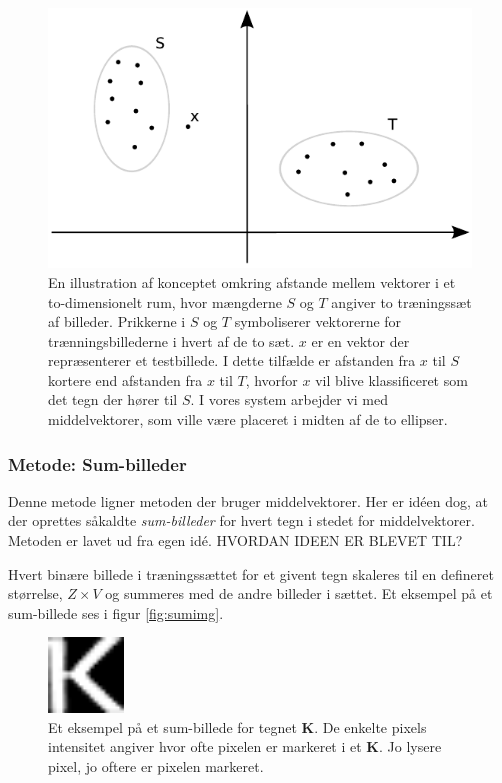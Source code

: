 \begin{figure}[htp]
\centering
\includegraphics{system/illu/middelvektor_afstand.pdf} 
\caption{En illustration af konceptet omkring afstande mellem vektorer i et to-dimensionelt rum, hvor mængderne $S$ og $T$ angiver to træningssæt af billeder. Prikkerne i $S$ og $T$ symboliserer vektorerne for trænningsbillederne i hvert af de to sæt. $x$ er en vektor der repræsenterer et testbillede. I dette tilfælde er afstanden fra $x$ til $S$ kortere end afstanden fra $x$ til $T$, hvorfor $x$ vil blive klassificeret som det tegn der hører til $S$. I vores system arbejder vi med middelvektorer, som ville være placeret i midten af de to ellipser.}
\label{fig:middelvektor_afstand}
\end{figure}

\subsubsection*{Metode: Sum-billeder}

Denne metode ligner metoden der bruger middelvektorer. Her er idéen dog, at der oprettes såkaldte \textit{sum-billeder} for hvert tegn i stedet for middelvektorer. Metoden er lavet ud fra egen idé. HVORDAN IDEEN ER BLEVET TIL?

Hvert binære billede i træningssættet for et givent tegn skaleres til en defineret størrelse, $Z \times V$ og summeres med de andre billeder i sættet. Et eksempel på et sum-billede ses i figur \vref{fig:sumimg}.

\begin{figure}[htp]
\centering
\includegraphics[width=2cm]{system/illu/sumimg.png} 
\caption{Et eksempel på et sum-billede for tegnet \textbf{K}. De enkelte pixels intensitet angiver hvor ofte pixelen er markeret i et \textbf{K}. Jo lysere pixel, jo oftere er pixelen markeret.}
\label{fig:sumimg}
\end{figure}


